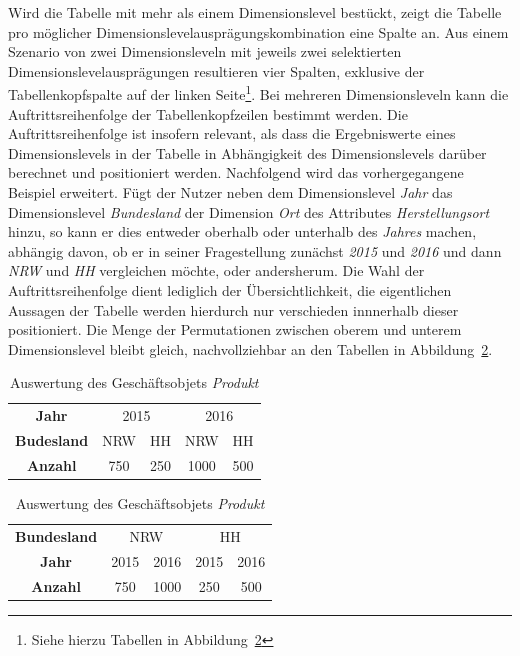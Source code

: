 \documentclass[
  language=german, %
  type=bachelor%
]{isthesis}
\begin{document}
\begin{content}
  Wird die Tabelle mit mehr als einem Dimensionslevel bestückt, zeigt die
  Tabelle pro möglicher Dimensionslevelausprägungskombination eine Spalte an.
  Aus einem Szenario von zwei Dimensionsleveln mit jeweils zwei selektierten
  Dimensionslevelausprägungen resultieren vier Spalten, exklusive der
  Tabellenkopfspalte auf der linken Seite\footnote{Siehe hierzu Tabellen in
  Abbildung~\ref{table:auftrittsreihenfolge}}. Bei mehreren Dimensionsleveln
  kann die Auftrittsreihenfolge der Tabellenkopfzeilen bestimmt werden. Die
  Auftrittsreihenfolge ist insofern relevant, als dass die Ergebniswerte eines
  Dimensionslevels in der Tabelle in Abhängigkeit des Dimensionslevels darüber
  berechnet und positioniert werden. Nachfolgend wird das vorhergegangene
  Beispiel erweitert. Fügt der Nutzer neben dem Dimensionslevel \textit{Jahr}
  das Dimensionslevel \textit{Bundesland} der Dimension \textit{Ort} des
  Attributes \textit{Herstellungsort} hinzu, so kann er dies entweder oberhalb oder
  unterhalb des \textit{Jahres} machen, abhängig davon, ob er in seiner
  Fragestellung zunächst \textit{2015} und \textit{2016} und dann \textit{NRW}
  und \textit{HH} vergleichen möchte, oder andersherum. Die Wahl der
  Auftrittsreihenfolge dient lediglich der Übersichtlichkeit, die eigentlichen
  Aussagen der Tabelle werden hierdurch nur verschieden innnerhalb dieser positioniert.
  Die Menge der Permutationen zwischen oberem und unterem Dimensionslevel
  bleibt gleich, nachvollziehbar an den Tabellen in
  Abbildung~\ref{table:auftrittsreihenfolge}.
  
  \begin{table}
    \footnotesize
    \begin{tabular}{c c c c c}
      \textbf{Jahr} & \multicolumn{2}{c}{2015} & \multicolumn{2}{c}{2016} \\
      \cmidrule(lr){2-3}\cmidrule(lr){4-5}
      \textbf{Budesland} & NRW & HH & NRW & HH \\
      \toprule
      \textbf{Anzahl} & 750 & 250 & 1000 & 500\\
    \end{tabular}
    \begin{tabular}{c c c c c}
      \textbf{Bundesland} & \multicolumn{2}{c}{NRW} & \multicolumn{2}{c}{HH} \\
      \cmidrule(lr){2-3}\cmidrule(lr){4-5}
      \textbf{Jahr} & 2015 & 2016 & 2015 & 2016 \\
      \toprule
      \textbf{Anzahl} & 750 & 1000 & 250 & 500 \\
    \end{tabular}
    \caption{Auswertung des Geschäftsobjets \textit{Produkt}}\label{table:auftrittsreihenfolge}
  \end{table}


\end{content}
\end{document}
